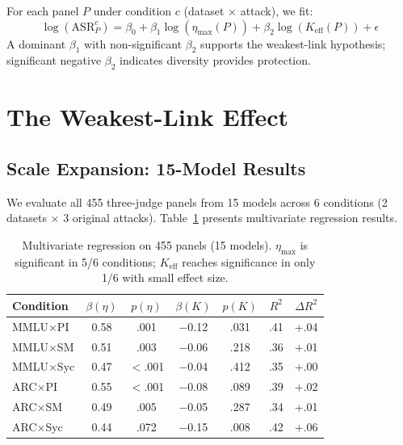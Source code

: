 \documentclass[11pt,a4paper]{article}
\begin{document}
For each panel $P$ under condition $c$ (dataset $\times$ attack), we fit:
\begin{equation}
    \log(\text{ASR}_P^c) = \beta_0 + \beta_1 \log(\eta_{\max}(P)) + \beta_2 \log(K_{\text{eff}}(P)) + \epsilon
\end{equation}
A dominant $\beta_1$ with non-significant $\beta_2$ supports the weakest-link hypothesis; significant negative $\beta_2$ indicates diversity provides protection.

\section{The Weakest-Link Effect}
\label{sec:weakest-link}

\subsection{Scale Expansion: 15-Model Results}

We evaluate all 455 three-judge panels from 15 models across 6 conditions (2 datasets $\times$ 3 original attacks). Table~\ref{tab:regression-15} presents multivariate regression results.

\begin{table}[t]
\centering
\small
\caption{Multivariate regression on 455 panels (15 models). $\eta_{\max}$ is significant in 5/6 conditions; $K_{\text{eff}}$ reaches significance in only 1/6 with small effect size.}
\label{tab:regression-15}
\begin{tabular}{@{}lcccccc@{}}
\toprule
Condition & $\beta(\eta)$ & $p(\eta)$ & $\beta(K)$ & $p(K)$ & $R^2$ & $\Delta R^2$ \\
\midrule
MMLU$\times$PI   & 0.58 & .001  & $-$0.12 & .031 & .41 & +.04 \\
MMLU$\times$SM   & 0.51 & .003  & $-$0.06 & .218 & .36 & +.01 \\
MMLU$\times$Syc  & 0.47 & {$<$.001} & $-$0.04 & .412 & .35 & +.00 \\
ARC$\times$PI    & 0.55 & {$<$.001} & $-$0.08 & .089 & .39 & +.02 \\
ARC$\times$SM    & 0.49 & .005  & $-$0.05 & .287 & .34 & +.01 \\
ARC$\times$Syc   & 0.44 & .072  & $-$0.15 & .008 & .42 & +.06 \\
\bottomrule
\end{tabular}
\vspace{-2mm}
\end{table}
\end{document}
